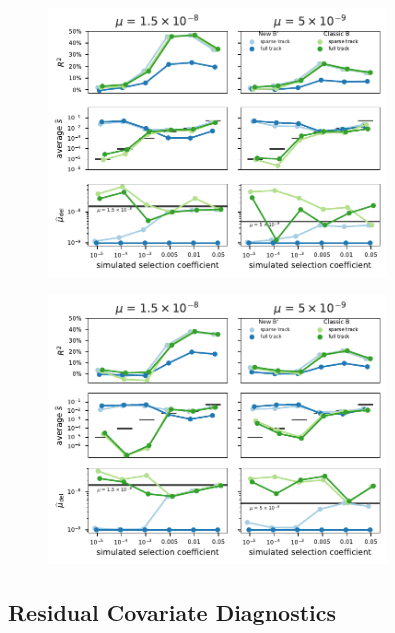 \documentclass[11pt]{article}
\begin{document}
\begin{figure}[htbp]
    \label{suppfig:sim-exp}
  \centering
  \includegraphics[width=0.8\textwidth]{figures/supplementary/subfigure_sim_mle_expansion.pdf}
  \caption{}
\end{figure}

\begin{figure}[htbp]
  \label{suppfig:sim-rec}
  \centering
  \includegraphics[width=0.8\textwidth]{figures/supplementary/subfigure_sim_mle_recessive.pdf}
  \caption{}
\end{figure}


\subsection{Residual Covariate Diagnostics}
\end{document}
